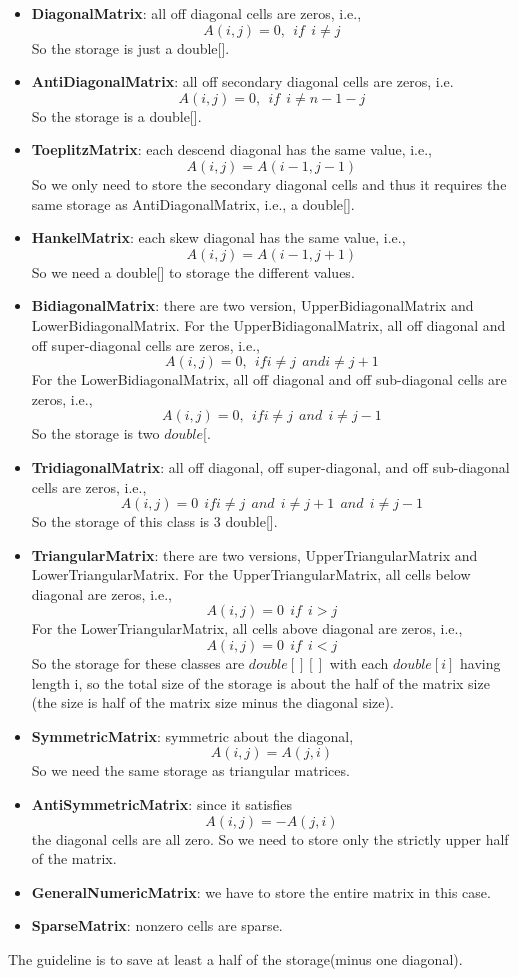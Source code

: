 \begin{itemize}
\item \textbf{DiagonalMatrix}: all off diagonal cells are zeros, i.e., \[A(i, j) = 0, \ \   if \ \  i \neq j\] So the storage is just a double[].
\item \textbf{AntiDiagonalMatrix}: all off secondary diagonal cells are zeros, i.e. \[A(i, j) = 0, \ \ if \ \ i \neq n-1-j\]
So the storage is a double[].
\item \textbf{ToeplitzMatrix}: each descend diagonal has the same value, i.e., \[A(i, j) =A(i-1, j-1)\] So we only need to store the secondary diagonal cells and thus it requires the same storage as AntiDiagonalMatrix, i.e., a double[]. 
\item \textbf{HankelMatrix}: each skew diagonal has the same value, i.e., \[A(i, j) = A(i-1, j+1)\] So we need a double[] to storage the different values.
\item \textbf{BidiagonalMatrix}: there are two version, UpperBidiagonalMatrix and LowerBidiagonalMatrix. For the UpperBidiagonalMatrix, all off diagonal and off super-diagonal cells are zeros, i.e., \[A(i, j) = 0, \ \ if i \neq j \ \ and i \neq j+1\] For the LowerBidiagonalMatrix, all off diagonal and off sub-diagonal cells are zeros, i.e., \[A(i, j) = 0, \ \ if i \neq j \ \ and \ \ i \neq j -1 \] So the storage is two $double[$. 
\item \textbf{TridiagonalMatrix}: all off diagonal, off super-diagonal, and off sub-diagonal cells are zeros, i.e., \[A(i, j) = 0 \ \ if i \neq j \ \ and \ \  i \neq j+1 \ \ and \ \ i \neq j-1\] So the storage of this class is 3 double[].
\item \textbf{TriangularMatrix}: there are two versions, UpperTriangularMatrix and LowerTriangularMatrix. For the UpperTriangularMatrix, all cells below diagonal are zeros, i.e., \[A(i, j) = 0 \ \ if \ \ i > j\] For the LowerTriangularMatrix, all cells above diagonal are zeros, i.e., \[A(i, j) = 0 \ \ if \ \ i < j\] So the storage for these classes are $double[][]$ with each $double[i]$ having length i, so the total size of the storage is about the half of the matrix size (the size is half of the matrix size minus the diagonal size).
\item \textbf{SymmetricMatrix}: symmetric about the diagonal, \[A(i, j) = A(j, i)\] So we need the same storage as triangular matrices.
\item \textbf{AntiSymmetricMatrix}: since it satisfies \[A(i, j) = -A(j, i)\] the diagonal cells are all zero. So we need to store only the strictly upper half of the matrix.
\item \textbf{GeneralNumericMatrix}: we have to store the entire matrix in this case.
\item \textbf{SparseMatrix}: nonzero cells are sparse.
\end{itemize}
The guideline is to save at least a half of the storage(minus one diagonal).

